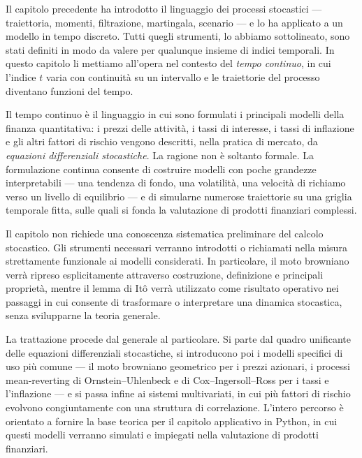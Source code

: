 Il capitolo precedente ha introdotto il linguaggio dei processi
stocastici --- traiettoria, momenti, filtrazione, martingala, scenario
--- e lo ha applicato a un modello in tempo discreto. Tutti quegli
strumenti, lo abbiamo sottolineato, sono stati definiti in modo da
valere per qualunque insieme di indici temporali. In questo capitolo
li mettiamo all'opera nel contesto del \emph{tempo continuo}, in cui
l'indice $t$ varia con continuit\`{a} su un intervallo e le traiettorie
del processo diventano funzioni del tempo.

Il tempo continuo \`{e} il linguaggio in cui sono formulati i
principali modelli della finanza quantitativa: i prezzi delle
attivit\`{a}, i tassi di interesse, i tassi di inflazione e gli altri
fattori di rischio vengono descritti, nella pratica di mercato, da
\emph{equazioni differenziali stocastiche}. La ragione non \`{e}
soltanto formale. La formulazione continua consente di costruire
modelli con poche grandezze interpretabili --- una tendenza di fondo,
una volatilit\`{a}, una velocit\`{a} di richiamo verso un livello di
equilibrio --- e di simularne numerose traiettorie su una griglia temporale
fitta, sulle quali si fonda la valutazione di prodotti
finanziari complessi.



Il capitolo non richiede una conoscenza sistematica preliminare del
calcolo stocastico. Gli strumenti necessari verranno introdotti o
richiamati nella misura strettamente funzionale ai modelli considerati.
In particolare, il moto browniano verr\`{a} ripreso esplicitamente
attraverso costruzione, definizione e principali propriet\`{a}, mentre
il lemma di It\^{o} verr\`{a} utilizzato come risultato operativo nei
passaggi in cui consente di trasformare o interpretare una dinamica
stocastica, senza svilupparne la teoria generale.

La trattazione procede dal generale al particolare. Si parte dal
quadro unificante delle equazioni differenziali stocastiche, si
introducono poi i modelli specifici di uso pi\`{u} comune --- il moto
browniano geometrico per i prezzi azionari, i processi mean-reverting
di Ornstein--Uhlenbeck e di Cox--Ingersoll--Ross per i tassi e
l'inflazione --- e si passa infine ai sistemi multivariati, in cui
pi\`{u} fattori di rischio evolvono congiuntamente con una struttura
di correlazione. L'intero percorso \`{e} orientato a fornire la base
teorica per il capitolo applicativo in Python, in cui questi modelli
verranno simulati e impiegati nella valutazione di prodotti
finanziari.

